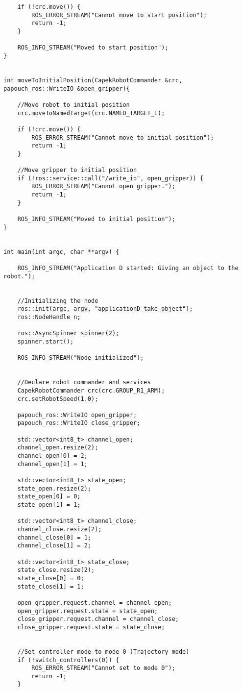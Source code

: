 \begin{lstlisting}
	if (!crc.move()) {
		ROS_ERROR_STREAM("Cannot move to start position");
		return -1;
	}

	ROS_INFO_STREAM("Moved to start position");
}


int moveToInitialPosition(CapekRobotCommander &crc, papouch_ros::WriteIO &open_gripper){

	//Move robot to initial position
	crc.moveToNamedTarget(crc.NAMED_TARGET_L);

	if (!crc.move()) {
		ROS_ERROR_STREAM("Cannot move to initial position");
		return -1;
	}

	//Move gripper to initial position
	if (!ros::service::call("/write_io", open_gripper)) {
		ROS_ERROR_STREAM("Cannot open gripper.");
		return -1;
	}

	ROS_INFO_STREAM("Moved to initial position");
}


int main(int argc, char **argv) {

	ROS_INFO_STREAM("Application D started: Giving an object to the robot.");


	//Initializing the node
	ros::init(argc, argv, "applicationD_take_object");
	ros::NodeHandle n;

	ros::AsyncSpinner spinner(2);
	spinner.start();

	ROS_INFO_STREAM("Node initialized");

	
	//Declare robot commander and services
	CapekRobotCommander crc(crc.GROUP_R1_ARM);
	crc.setRobotSpeed(1.0);

	papouch_ros::WriteIO open_gripper;
	papouch_ros::WriteIO close_gripper;

	std::vector<int8_t> channel_open;
	channel_open.resize(2);
	channel_open[0] = 2;
	channel_open[1] = 1;

	std::vector<int8_t> state_open;
	state_open.resize(2);
	state_open[0] = 0;
	state_open[1] = 1;

	std::vector<int8_t> channel_close;
	channel_close.resize(2);
	channel_close[0] = 1;
	channel_close[1] = 2;

	std::vector<int8_t> state_close;
	state_close.resize(2);
	state_close[0] = 0;
	state_close[1] = 1;

	open_gripper.request.channel = channel_open;
	open_gripper.request.state = state_open;
	close_gripper.request.channel = channel_close;
	close_gripper.request.state = state_close;

	
	//Set controller mode to mode 0 (Trajectory mode)
	if (!switch_controllers(0)) {
		ROS_ERROR_STREAM("Cannot set to mode 0");
		return -1;
	}


\end{lstlisting}
